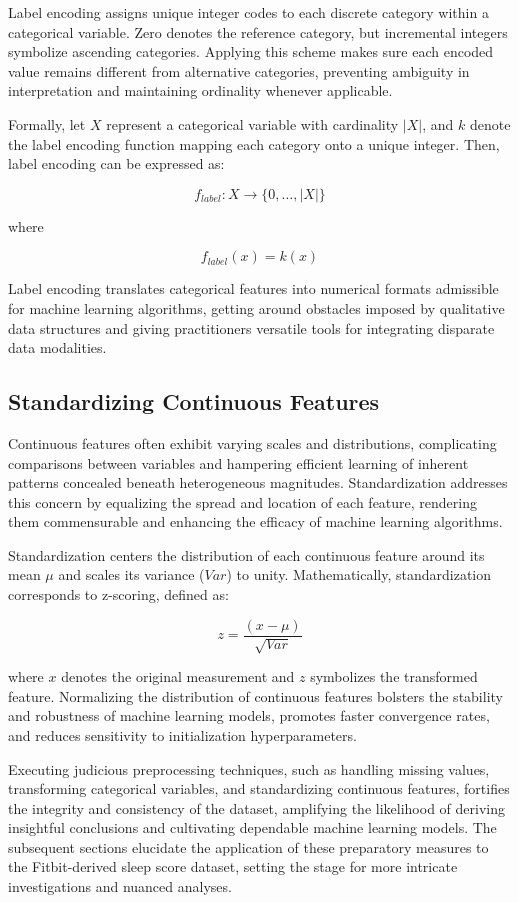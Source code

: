 \documentclass[10pt]{extarticle}
\begin{document}
Label encoding assigns unique integer codes to each discrete category within a categorical variable. Zero denotes the reference category, but incremental integers symbolize ascending categories. Applying this scheme makes sure each encoded value remains different from alternative categories, preventing ambiguity in interpretation and maintaining ordinality whenever applicable.

Formally, let \(X\) represent a categorical variable with cardinality \(\left|X\right|\), and \(k\) denote the label encoding function mapping each category onto a unique integer. Then, label encoding can be expressed as:

\[
f_{label}: X \rightarrow \{0, \ldots , \left|X\right|\}
\]

where

\[
f_{label}(x) = k(x)
\]

Label encoding translates categorical features into numerical formats admissible for machine learning algorithms, getting around obstacles imposed by qualitative data structures and giving practitioners versatile tools for integrating disparate data modalities.

\subsection{Standardizing Continuous Features}

Continuous features often exhibit varying scales and distributions, complicating comparisons between variables and hampering efficient learning of inherent patterns concealed beneath heterogeneous magnitudes. Standardization addresses this concern by equalizing the spread and location of each feature, rendering them commensurable and enhancing the efficacy of machine learning algorithms.

Standardization centers the distribution of each continuous feature around its mean \(\mu{}\) and scales its variance (\(Var\)) to unity. Mathematically, standardization corresponds to z-scoring, defined as:

\[
z = \frac{(x - \mu)}{\sqrt{Var}}
\]

where \(x\) denotes the original measurement and \(z\) symbolizes the transformed feature. Normalizing the distribution of continuous features bolsters the stability and robustness of machine learning models, promotes faster convergence rates, and reduces sensitivity to initialization hyperparameters.

Executing judicious preprocessing techniques, such as handling missing values, transforming categorical variables, and standardizing continuous features, fortifies the integrity and consistency of the dataset, amplifying the likelihood of deriving insightful conclusions and cultivating dependable machine learning models. The subsequent sections elucidate the application of these preparatory measures to the Fitbit-derived sleep score dataset, setting the stage for more intricate investigations and nuanced analyses.
\end{document}
